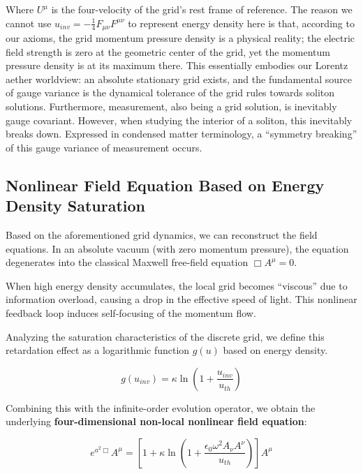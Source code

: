 \documentclass[12pt, a4paper]{article}
\begin{document}
Where $U^\mu$ is the four-velocity of the grid's rest frame of reference. 
The reason we cannot use $u_{inv} = -\frac{1}{4} F_{\mu\nu}F^{\mu\nu}$ to represent energy density here is that, according to our axioms, the grid momentum pressure density is a physical reality; the electric field strength is zero at the geometric center of the grid, yet the momentum pressure density is at its maximum there. 
This essentially embodies our Lorentz aether worldview: an absolute stationary grid exists, and the fundamental source of gauge variance is the dynamical tolerance of the grid rules towards soliton solutions. Furthermore, measurement, also being a grid solution, is inevitably gauge covariant. However, when studying the interior of a soliton, this inevitably breaks down. Expressed in condensed matter terminology, a ``symmetry breaking'' of this gauge variance of measurement occurs.

\subsection{Nonlinear Field Equation Based on Energy Density Saturation}

Based on the aforementioned grid dynamics, we can reconstruct the field equations. In an absolute vacuum (with zero momentum pressure), the equation degenerates into the classical Maxwell free-field equation $\Box A^\mu = 0$.

When high energy density accumulates, the local grid becomes ``viscous'' due to information overload, causing a drop in the effective speed of light. This nonlinear feedback loop induces self-focusing of the momentum flow. 

Analyzing the saturation characteristics of the discrete grid, we define this retardation effect as a logarithmic function $g(u)$ based on energy density.

\begin{equation}
g(u_{inv})= \kappa \ln\left(1 + \frac{u_{inv}}{u_{th}}\right)
\end{equation}

Combining this with the infinite-order evolution operator, we obtain the underlying \textbf{four-dimensional non-local nonlinear field equation}:

\begin{equation}
e^{a^2 \Box} A^\mu = \left[ 1 + \kappa \ln\left(1 + \frac{\epsilon_0 \omega^2 A_\nu A^\nu}{u_{th}}\right) \right] A^\mu 
\end{equation}
\end{document}
